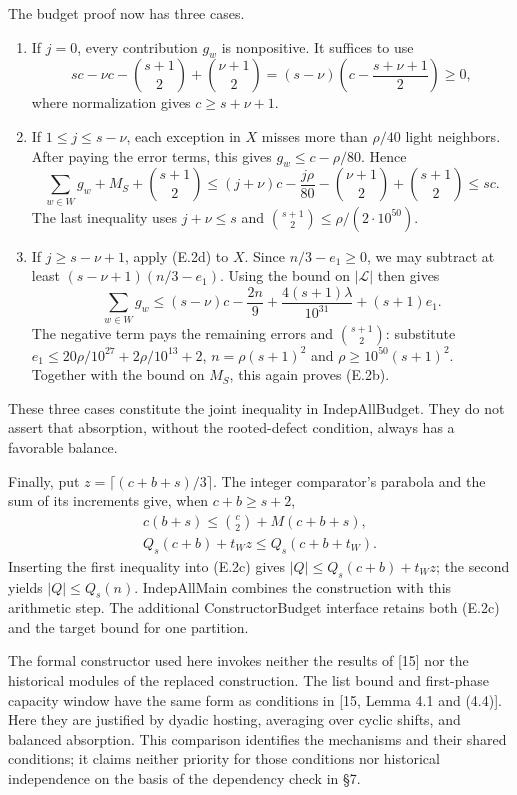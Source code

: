 \documentclass[english,11pt,a4paper]{article}
\providecommand{\tightlist}{\setlength{\itemsep}{0pt}\setlength{\parskip}{0pt}}
\begin{document}
The budget proof now has three cases.

\begin{enumerate}
\def\labelenumi{\arabic{enumi}.}
\tightlist
\item
  If \(j=0\), every contribution \(g_w\) is nonpositive. It suffices to use \[
  sc-\nu c-\binom{s+1}2+\binom{\nu+1}2
  =(s-\nu)\left(c-\frac{s+\nu+1}{2}\right)\ge0,
  \] where normalization gives \(c\ge s+\nu+1\).
\item
  If \(1\le j\le s-\nu\), each exception in \(X\) misses more than \(\rho/40\) light neighbors. After paying the error terms, this gives \(g_w\le c-\rho/80\). Hence \[
  \sum_{w\in W}g_w+M_S+\binom{s+1}2
  \le(j+\nu)c-\frac{j\rho}{80}
       -\binom{\nu+1}2+\binom{s+1}2\le sc.
  \] The last inequality uses \(j+\nu\le s\) and \(\binom{s+1}2\le\rho/(2\cdot10^{50})\).
\item
  If \(j\ge s-\nu+1\), apply (E.2d) to \(X\). Since \(n/3-e_1\ge0\), we may subtract at least \((s-\nu+1)(n/3-e_1)\). Using the bound on \(|\mathcal L|\) then gives \[
  \sum_{w\in W}g_w
  \le (s-\nu)c-\frac{2n}{9}
     +\frac{4(s+1)\lambda}{10^{31}}+(s+1)e_1.
  \] The negative term pays the remaining errors and \(\binom{s+1}2\): substitute \(e_1\le20\rho/10^{27}+2\rho/10^{13}+2\), \(n=\rho(s+1)^2\) and \(\rho\ge10^{50}(s+1)^2\). Together with the bound on \(M_S\), this again proves (E.2b).
\end{enumerate}

These three cases constitute the joint inequality in IndepAllBudget. They do not assert that absorption, without the rooted-defect condition, always has a favorable balance.

Finally, put \(z=\lceil(c+b+s)/3\rceil\). The integer comparator's parabola and the sum of its increments give, when \(c+b\ge s+2\), \[
\begin{gathered}
c(b+s)\le\binom c2+M(c+b+s),\\
Q_s(c+b)+t_W z\le Q_s(c+b+t_W).
\end{gathered}
\tag{E.2e}
\] Inserting the first inequality into (E.2c) gives \(|Q|\le Q_s(c+b)+t_W z\); the second yields \(|Q|\le Q_s(n)\). IndepAllMain combines the construction with this arithmetic step. The additional ConstructorBudget interface retains both (E.2c) and the target bound for one partition.

The formal constructor used here invokes neither the results of {[}15{]} nor the historical modules of the replaced construction. The list bound and first-phase capacity window have the same form as conditions in {[}15, Lemma 4.1 and (4.4){]}. Here they are justified by dyadic hosting, averaging over cyclic shifts, and balanced absorption. This comparison identifies the mechanisms and their shared conditions; it claims neither priority for those conditions nor historical independence on the basis of the dependency check in §7.
\end{document}
